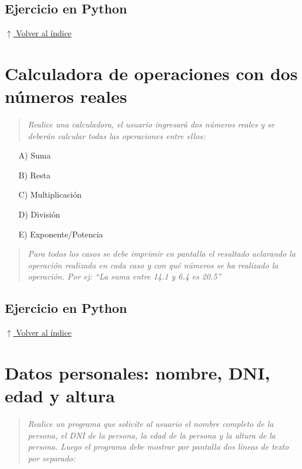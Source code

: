 \documentclass[12pt]{article}
\newcommand{\codigopython}[2]{%
}
\newcommand{\volverindice}{%
    \vspace{1em}%
    \begin{flushright}%
        \hyperlink{indice}{\small $\uparrow$ Volver al índice}%
    \end{flushright}%
}
\newcommand{\enunciado}[1]{%
    \begin{quote}
        \itshape #1
    \end{quote}
}
\begin{document}
\subsection*{Ejercicio en Python}

\codigopython{11}{Combinación de palabras con slicing}

\volverindice
\newpage


\section{Calculadora de operaciones con dos números reales}

\enunciado{Realice una calculadora, el usuario ingresará dos números reales y se deberán calcular todas las operaciones entre ellos:}

\begin{itemize}[noitemsep]
    \item[A)] Suma
    \item[B)] Resta
    \item[C)] Multiplicación
    \item[D)] División
    \item[E)] Exponente/Potencia
\end{itemize}

\enunciado{Para todos los casos se debe imprimir en pantalla el resultado aclarando la operación realizada en cada caso y con qué números se ha realizado la operación. Por ej: \enquote{La suma entre 14.1 y 6.4 es 20.5}}

\subsection*{Ejercicio en Python}

\codigopython{12}{Calculadora de operaciones con dos números reales}

\volverindice
\newpage


\section{Datos personales: nombre, DNI, edad y altura}

\enunciado{Realice un programa que solicite al usuario el nombre completo de la persona, el DNI de la persona, la edad de la persona y la altura de la persona. Luego el programa debe mostrar por pantalla dos líneas de texto por separado:}
\end{document}
